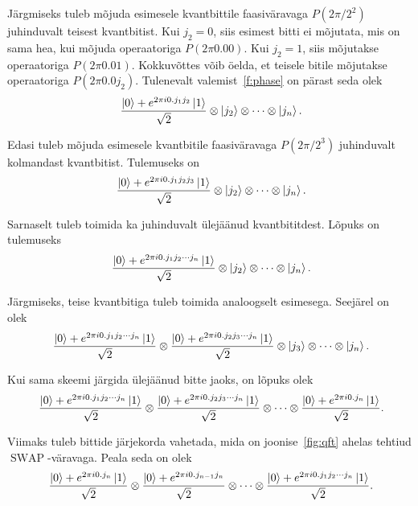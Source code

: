 \documentclass[12pt]{report}
\def\ket#1{\mathinner{|#1\rangle}}
\def\SWAP{\mathop{\mathrm{SWAP}}\nolimits}
\begin{document}
Järgmiseks tuleb mõjuda esimesele kvantbittile faasiväravaga \(P(2\pi/2^2)\) juhinduvalt teisest kvantbitist.
Kui \(j_2 = 0\), siis esimest bitti ei mõjutata, mis on sama hea, kui mõjuda operaatoriga \(P(2\pi 0.00)\).
Kui \(j_2 = 1\), siis mõjutakse operaatoriga \(P(2\pi 0.01)\).
Kokkuvõttes võib öelda, et teisele bitile mõjutakse operaatoriga \(P(2\pi 0.0j_2)\).
Tulenevalt valemist~\ref{f:phase} on pärast seda olek
\begin{align}
    \frac{\ket{0} + e^{2\pi i0.j_1j_2}\ket{1}}{\sqrt{2}} \otimes \ket{j_2} \otimes \cdots \otimes \ket{j_n} \rlap{.}
\end{align}

Edasi tuleb mõjuda esimesele kvantbitile faasiväravaga \(P(2\pi/2^3)\) juhinduvalt kolmandast kvantbitist.
Tulemuseks on
\begin{align}
    \frac{\ket{0} + e^{2\pi i0.j_1j_2j_3}\ket{1}}{\sqrt{2}} \otimes \ket{j_2} \otimes \cdots \otimes \ket{j_n} \rlap{.}
\end{align}

Sarnaselt tuleb toimida ka juhinduvalt ülejäänud kvantbititdest.
Lõpuks on tulemuseks
\begin{align}
    \frac{\ket{0} + e^{2\pi i0.j_1j_2\cdots j_n}\ket{1}}{\sqrt{2}} \otimes \ket{j_2} \otimes \cdots \otimes \ket{j_n} \rlap{.}
\end{align}

Järgmiseks, teise kvantbitiga tuleb toimida analoogselt esimesega.
Seejärel on olek
\begin{align}
    \frac{\ket{0} + e^{2\pi i0.j_1j_2\cdots j_n}\ket{1}}{\sqrt{2}}
    \otimes \frac{\ket{0} + e^{2\pi i0.j_2j_3\cdots j_n}\ket{1}}{\sqrt{2}}
    \otimes \ket{j_3} \otimes \cdots \otimes \ket{j_n} \rlap{.}
\end{align}

Kui sama skeemi järgida ülejäänud bitte jaoks, on lõpuks olek
\begin{align}
    \frac{\ket{0} + e^{2\pi i0.j_1j_2\cdots j_n}\ket{1}}{\sqrt{2}}
    \otimes \frac{\ket{0} + e^{2\pi i0.j_2j_3\cdots j_n}\ket{1}}{\sqrt{2}}
    \otimes \cdots
    \otimes \frac{\ket{0} + e^{2\pi i0.j_n}\ket{1}}{\sqrt{2}} \rlap{.}
\end{align}

Viimaks tuleb bittide järjekorda vahetada, mida on joonise~\ref{fig:qft} ahelas tehtiud \(\SWAP\)-väravaga.
Peala seda on olek
\begin{align}\label{f:qftfinal}
    \frac{\ket{0} + e^{2\pi i0.j_n}\ket{1}}{\sqrt{2}}
    \otimes \frac{\ket{0} + e^{2\pi i0.j_{n-1}j_n}}{\sqrt{2}}
    \otimes \cdots
    \otimes \frac{\ket{0} + e^{2\pi i0.j_1j_2\cdots j_n}\ket{1}}{\sqrt{2}} \rlap{.}
\end{align}
\end{document}

